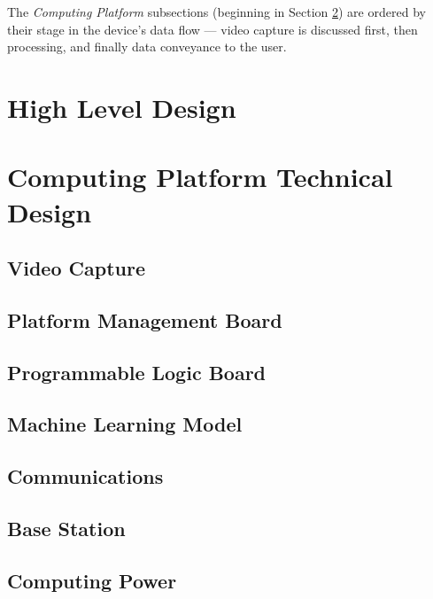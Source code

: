 \documentclass[10pt,letterpaper]{article}
\begin{document}
The \textit{Computing Platform} subsections (beginning in Section \ref{computing_platform}) are ordered by their stage in the device's data flow --- video capture is discussed first, then processing, and finally data conveyance to the user.

\newpage
\section{High Level Design}\label{high_level_design}


\section{Computing Platform Technical Design}\label{computing_platform}

\subsection{Video Capture}\label{video_capture}


\subsection{Platform Management Board}\label{platform_management}


\subsection{Programmable Logic Board}\label{programmable_logic}


\subsection{Machine Learning Model}\label{machine_learning}


\subsection{Communications}\label{communications}


\subsection{Base Station}\label{base_station}


\subsection{Computing Power}\label{computing_power}

\end{document}
